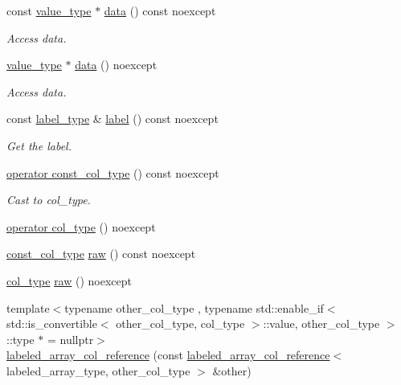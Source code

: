 \begin{DoxyCompactItemize}
const \hyperlink{classIceBRG_1_1labeled__array__col__reference_ab9d93b07ec3e0fbfb0604ac8b135d04d}{value\+\_\+type} $\ast$ \hyperlink{classIceBRG_1_1labeled__array__col__reference_a3a9429016032503f90d2b648d9858551}{data} () const  noexcept
\begin{DoxyCompactList}\small\item\em Access data. \end{DoxyCompactList}\item 
\hyperlink{classIceBRG_1_1labeled__array__col__reference_ab9d93b07ec3e0fbfb0604ac8b135d04d}{value\+\_\+type} $\ast$ \hyperlink{classIceBRG_1_1labeled__array__col__reference_a85f72aed7d943652a7dd64a959c664b3}{data} () noexcept
\begin{DoxyCompactList}\small\item\em Access data. \end{DoxyCompactList}\item 
const \hyperlink{classIceBRG_1_1labeled__array__col__reference_a8dc48f0fd0cd4b9813289a8b6db0f9b6}{label\+\_\+type} \& \hyperlink{classIceBRG_1_1labeled__array__col__reference_a5221fd3e7f0cc79bea2977b99b43702c}{label} () const  noexcept
\begin{DoxyCompactList}\small\item\em Get the label. \end{DoxyCompactList}\item 
\hyperlink{classIceBRG_1_1labeled__array__col__reference_ab0f5033ddc844b59868ca542ab74503b}{operator const\+\_\+col\+\_\+type} () const  noexcept
\begin{DoxyCompactList}\small\item\em Cast to col\+\_\+type. \end{DoxyCompactList}\item 
\hyperlink{classIceBRG_1_1labeled__array__col__reference_ab8491b8d81eab37154a5d397bb7424e4}{operator col\+\_\+type} () noexcept
\item 
\hyperlink{classIceBRG_1_1labeled__array__col__reference_a00d71fc36336ea5879c401a111ac53f4}{const\+\_\+col\+\_\+type} \hyperlink{classIceBRG_1_1labeled__array__col__reference_a7312c12e21c8f266999384df3e06106e}{raw} () const  noexcept
\item 
\hyperlink{classIceBRG_1_1labeled__array__col__reference_ad55f27046974468dea6e20647571e4e0}{col\+\_\+type} \hyperlink{classIceBRG_1_1labeled__array__col__reference_a2e1f06f1f7546457b3efb4474ab8dc70}{raw} () noexcept
\item 
{\footnotesize template$<$typename other\+\_\+col\+\_\+type , typename std\+::enable\+\_\+if$<$ std\+::is\+\_\+convertible$<$ other\+\_\+col\+\_\+type, col\+\_\+type $>$\+::value, other\+\_\+col\+\_\+type $>$\+::type $\ast$  = nullptr$>$ }\\\hyperlink{classIceBRG_1_1labeled__array__col__reference_ac4aea66aa3a541ea9a8d00701564d0ce}{labeled\+\_\+array\+\_\+col\+\_\+reference} (const \hyperlink{classIceBRG_1_1labeled__array__col__reference}{labeled\+\_\+array\+\_\+col\+\_\+reference}$<$ labeled\+\_\+array\+\_\+type, other\+\_\+col\+\_\+type $>$ \&other)

\end{DoxyCompactItemize}
